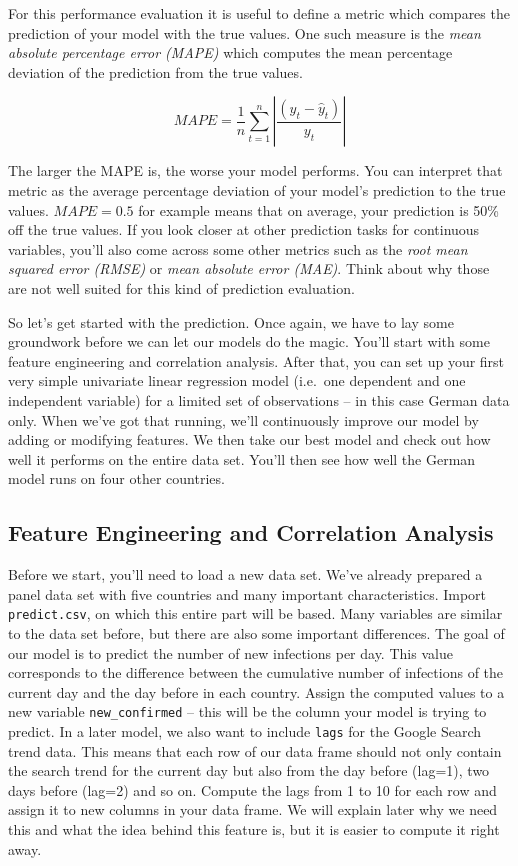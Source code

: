 \documentclass[
  11pt,
]{article}
\begin{document}
For this performance evaluation it is useful to define a metric which compares the prediction of your model with the true values. One such measure is the \emph{mean absolute percentage error (MAPE)} which computes the mean percentage deviation of the prediction from the true values.

\[ MAPE = \frac{1}{n} \sum_{t=1}^n \left\lvert\frac{(y_t - \hat{y}_t)}{y_t}\right\rvert \]

The larger the MAPE is, the worse your model performs. You can interpret that metric as the average percentage deviation of your model's prediction to the true values. \(MAPE = 0.5\) for example means that on average, your prediction is 50\% off the true values. If you look closer at other prediction tasks for continuous variables, you'll also come across some other metrics such as the \emph{root mean squared error (RMSE)} or \emph{mean absolute error (MAE)}. Think about why those are not well suited for this kind of prediction evaluation.

So let's get started with the prediction. Once again, we have to lay some groundwork before we can let our models do the magic. You'll start with some feature engineering and correlation analysis. After that, you can set up your first very simple univariate linear regression model (i.e.~one dependent and one independent variable) for a limited set of observations -- in this case German data only. When we've got that running, we'll continuously improve our model by adding or modifying features. We then take our best model and check out how well it performs on the entire data set. You'll then see how well the German model runs on four other countries.

\hypertarget{feature-engineering-and-correlation-analysis}{%
\subsection{Feature Engineering and Correlation Analysis}\label{feature-engineering-and-correlation-analysis}}

Before we start, you'll need to load a new data set. We've already prepared a panel data set with five countries and many important characteristics. Import \texttt{predict.csv}, on which this entire part will be based. Many variables are similar to the data set before, but there are also some important differences.
The goal of our model is to predict the number of new infections per day. This value corresponds to the difference between the cumulative number of infections of the current day and the day before in each country. Assign the computed values to a new variable \texttt{new\_confirmed} -- this will be the column your model is trying to predict.
In a later model, we also want to include \texttt{lags} for the Google Search trend data. This means that each row of our data frame should not only contain the search trend for the current day but also from the day before (lag=1), two days before (lag=2) and so on. Compute the lags from 1 to 10 for each row and assign it to new columns in your data frame. We will explain later why we need this and what the idea behind this feature is, but it is easier to compute it right away.
\end{document}
